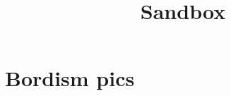 \documentclass{amsart}
\begin{document}
	
	\title{Sandbox}
	
	\maketitle

\section{Bordism pics}

%				
%			
%			
%			
%			
%			
%			
%			
\end{document}
